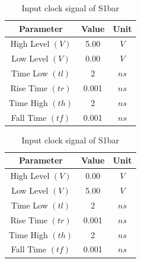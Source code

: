 \documentclass[a4paper,12pt]{article}
\begin{document}
\begin{table}[H]
\begin{subtable}[t]{0.48\textwidth}
				\caption{Input clock signal of S0bar} %
			\end{subtable}
			\begin{subtable}[t]{0.48\textwidth} %
				\centering
				\begin{tabular}{|c|c|c|}
					\hline
					\textbf{Parameter}          & \textbf{Value} & \textbf{Unit} \\ \hline
					High Level $(V)$            & 5.00           & $V$           \\ \hline
					Low Level $(V)$             & 0.00           & $V$           \\ \hline
					Time Low $(tl)$             & 2         & $ns$          \\ \hline
					Rise Time $(tr)$            & 0.001          & $ns$          \\ \hline
					Time High $(th)$            & 2          & $ns$          \\ \hline
					Fall Time $(tf)$            & 0.001          & $ns$          \\ \hline
				\end{tabular}
				
				\caption{Input clock signal of S1} %
			\end{subtable}
			\hfil
			\begin{subtable}[t]{0.48\textwidth} %
				\centering
				\begin{tabular}{|c|c|c|}
					\hline
					\textbf{Parameter}          & \textbf{Value} & \textbf{Unit} \\ \hline
					High Level $(V)$            & 0.00           & $V$           \\ \hline
					Low Level $(V)$             & 5.00           & $V$           \\ \hline
					Time Low $(tl)$             & 2          & $ns$          \\ \hline
					Rise Time $(tr)$            & 0.001          & $ns$          \\ \hline
					Time High $(th)$            & 2        & $ns$          \\ \hline
					Fall Time $(tf)$            & 0.001          & $ns$          \\ \hline
				\end{tabular}
				
				\caption{Input clock signal of S1bar} %
			\end{subtable}
		\end{table}
		
\end{document}

